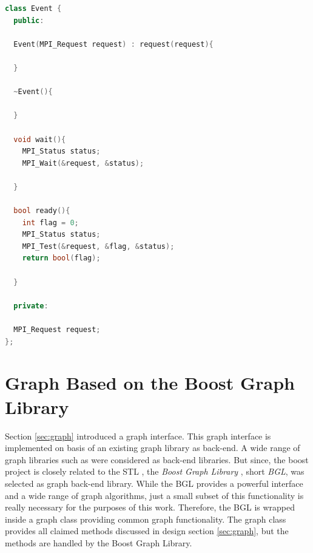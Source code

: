 \begin{lstlisting}[language=C++, label=lst:mpi_event]
class Event {
  public:

  Event(MPI_Request request) : request(request){
    
  }
  
  ~Event(){
    
  }

  void wait(){
    MPI_Status status;
    MPI_Wait(&request, &status);
    
  }

  bool ready(){
    int flag = 0;
    MPI_Status status;
    MPI_Test(&request, &flag, &status);
    return bool(flag);
    
  }
  
  private:
  
  MPI_Request request;
};  
\end{lstlisting}

\section{Graph Based on the Boost Graph Library}
Section \ref{sec:graph} introduced a graph interface.  This graph
interface is implemented on basis of an existing graph library as
back-end. A wide range of graph libraries such as \cite{ref:lemon,
  ref:boost_bgl, ref:igraph, ref:ogdf} were considered as back-end
libraries.  But since, the boost project is closely related to the STL
, the \emph{Boost Graph Library} \cite{ref:boost_bgl}, short \emph{BGL}, was
selected as graph back-end library.  While the BGL provides a powerful
interface and a wide range of graph algorithms, just a small subset of
this functionality is really necessary for the purposes of this
work. Therefore, the BGL is wrapped inside a graph class providing
common graph functionality.  The graph class provides all claimed
methods discussed in design section \ref{sec:graph}, but the methods
are handled by the Boost Graph Library.


